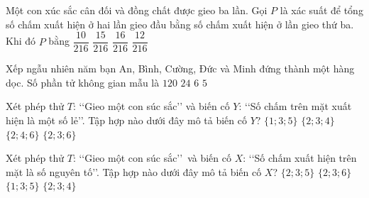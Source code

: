 \begin{ex}%
	Một con xúc sắc cân đối và đồng chất được gieo ba lần. Gọi $P$ là xác suất để tổng số chấm xuất hiện ở hai lần gieo đầu bằng số chấm xuất hiện ở lần gieo thứ ba. Khi đó $P$ bằng
	\choice
	{$\dfrac{10}{216}$}
	{\True $\dfrac{15}{216}$}
	{$\dfrac{16}{216}$}
	{$\dfrac{12}{216}$}
\end{ex}

\begin{ex}%
	Xếp ngẫu nhiên năm bạn An, Bình, Cường, Đức và Minh đứng  thành một hàng dọc. Số phần tử không gian mẫu là
	\choice
	{\True $120$}
	{$24$}
	{$6$}
	{$5$}	
\end{ex}
\begin{ex}%
	Xét phép thử $T$: \lq\lq  Gieo một con súc sắc\rq\rq\;  và biến cố $Y$: \lq\lq  Số chấm trên mặt xuất hiện là một số lẻ\rq\rq. Tập hợp nào dưới đây mô tả biến cố $Y$?
	\choice
	{\True $\{1;3;5\}$}
	{$\{2;3;4\}$}
	{$\{2;4;6\}$}
	{$\{2;3;6\}$}	
\end{ex}
\begin{ex}%
	Xét phép thử $T$: \lq\lq  Gieo một con súc sắc\rq\rq\
	và  biến cố $X$: \lq\lq  Số chấm xuất hiện trên mặt là số nguyên tố\rq\rq. Tập hợp nào dưới đây mô tả biến cố $X$?
	\choice
	{\True $\{2;3;5\}$}
	{$\{2;3;6\}$}
	{$\{1;3;5\}$}
	{$\{2;3;4\}$}	
\end{ex}

